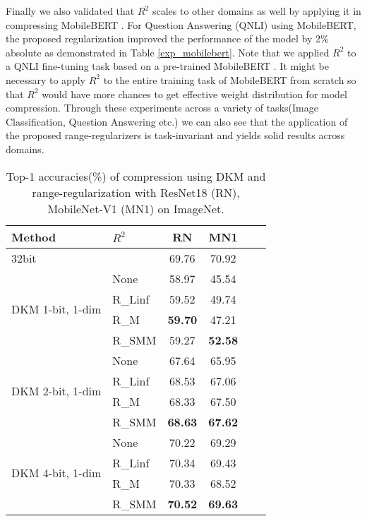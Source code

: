 \documentclass[10pt,twocolumn,letterpaper]{article}
\begin{document}
Finally we also validated that $R^2$ scales to other domains as well by applying it in compressing MobileBERT \cite{sun2020mobilebert}. For Question Answering (QNLI) \cite{rajpurkar2016squad} using MobileBERT, the proposed regularization improved the performance of the model by 2\% absolute as demonstrated in Table \ref{exp_mobilebert}. Note that we applied $R^2$ to a QNLI fine-tuning task based on a pre-trained MobileBERT \cite{wolf2020transformers}. It might be necessary to apply $R^2$ to the entire training task of MobileBERT from scratch so that $R^2$ would have more chances to get effective weight distribution for model compression. Through these experiments across a variety of tasks(Image Classification, Question Answering etc.) we can also see that the application of the proposed range-regularizers is task-invariant and yields solid results across domains.

\begin{table}[t]
\caption{Top-1 accuracies(\%) of compression using DKM and range-regularization with ResNet18 (RN), MobileNet-V1 (MN1) on ImageNet.} \label{table_comp_exp}
\vskip 0.15in
\begin{center}
\begin{small}
\begin{sc}
\begin{tabular}{llcccc}
\toprule
Method & $R^{2}$ & RN & MN1\\
\midrule
32bit &   & 69.76 & 70.92\\


\midrule
\multirow{4}{*}{DKM 1-bit, 1-dim}    & None        & 58.97 & 45.54\\
                        & R\_Linf    & 59.52 & 49.74 \\
                        & R\_M    &  \textbf{59.70} & 47.21\\
                        & R\_SMM    & 59.27 & \textbf{52.58} \\
                        \midrule
\multirow{4}{*}{DKM 2-bit, 1-dim}    & None     & 67.64 & 65.95 \\
                                     & R\_Linf  & 68.53 & 67.06 \\
                                     & R\_M     & 68.33 & 67.50 \\
                                     & R\_SMM   & \textbf{68.63} & \textbf{67.62} \\
                        \midrule
\multirow{4}{*}{DKM 4-bit, 1-dim}    
                        & None     & 70.22 & 69.29 \\
                        & R\_Linf    & 70.34 & 69.43 \\
                        & R\_M    & 70.33 & 68.52 \\
                        & R\_SMM    & \textbf{70.52} & \textbf{69.63} \\
\bottomrule
\end{tabular}
\end{sc}
\end{small}
\end{center}
\vskip -0.1in
\end{table}
\end{document}
